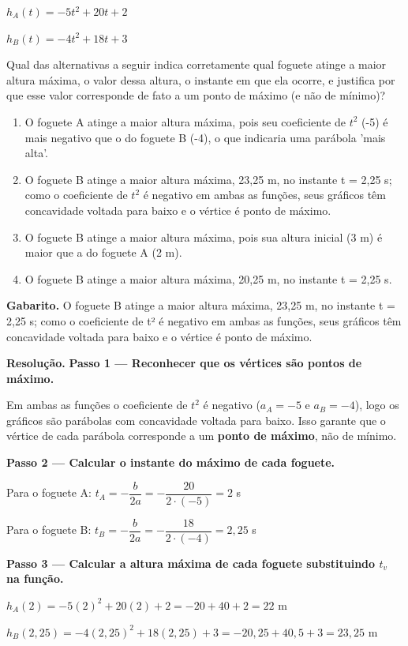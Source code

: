 \documentclass[11pt,a4paper]{article}
\begin{document}
$h_A(t) = -5t^2 + 20t + 2$

$h_B(t) = -4t^2 + 18t + 3$

Qual das alternativas a seguir indica corretamente qual foguete atinge a maior altura máxima, o valor dessa altura, o instante em que ela ocorre, e justifica por que esse valor corresponde de fato a um ponto de máximo (e não de mínimo)?
\begin{enumerate}[label=(\alph*)]
\item O foguete A atinge a maior altura máxima, pois seu coeficiente de $t^2$ (-5) é mais negativo que o do foguete B (-4), o que indicaria uma parábola 'mais alta'.
\item O foguete B atinge a maior altura máxima, 23,25 m, no instante t = 2,25 s; como o coeficiente de $t^2$ é negativo em ambas as funções, seus gráficos têm concavidade voltada para baixo e o vértice é ponto de máximo.
\item O foguete B atinge a maior altura máxima, pois sua altura inicial (3 m) é maior que a do foguete A (2 m).
\item O foguete B atinge a maior altura máxima, 20,25 m, no instante t = 2,25 s.
\end{enumerate}

\textbf{Gabarito.} O foguete B atinge a maior altura máxima, 23,25 m, no instante t = 2,25 s; como o coeficiente de t² é negativo em ambas as funções, seus gráficos têm concavidade voltada para baixo e o vértice é ponto de máximo.

\textbf{Resolução.} \textbf{Passo 1 — Reconhecer que os vértices são pontos de máximo.}

Em ambas as funções o coeficiente de $t^2$ é negativo ($a_A=-5$ e $a_B=-4$), logo os gráficos são parábolas com concavidade voltada para baixo. Isso garante que o vértice de cada parábola corresponde a um \textbf{ponto de máximo}, não de mínimo.

\textbf{Passo 2 — Calcular o instante do máximo de cada foguete.}

Para o foguete A: $t_A = -\dfrac{b}{2a} = -\dfrac{20}{2\cdot(-5)} = 2$ s

Para o foguete B: $t_B = -\dfrac{b}{2a} = -\dfrac{18}{2\cdot(-4)} = 2{,}25$ s

\textbf{Passo 3 — Calcular a altura máxima de cada foguete substituindo $t_v$ na função.}

$h_A(2) = -5(2)^2 + 20(2) + 2 = -20 + 40 + 2 = 22$ m

$h_B(2{,}25) = -4(2{,}25)^2 + 18(2{,}25) + 3 = -20{,}25 + 40{,}5 + 3 = 23{,}25$ m
\end{document}
